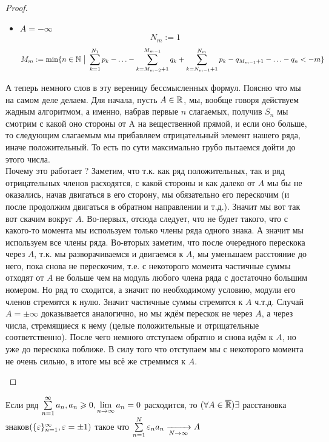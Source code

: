 \begin{proof}
\begin{itemize}
		
		\item $A = -\infty$
		\[
		N_m := 1
		\]
		\[
		M_m := \min \{n \in \mathbb{N} \ \big|\  \sum\limits_{k = 1}^{N_1} p_k - \ldots - \sum\limits_{k = M_{m - 2} + 1}^{M_{m - 1}} q_k + \sum\limits_{k = N_{m - 1} + 1}^{N_m} p_k - q_{M_{m - 1} + 1} - \ldots - q_n < -m\}
		\]
		
	\end{itemize}

\begin{anote}

	А теперь немного слов в эту вереницу бессмысленных формул. Поясню что мы на самом деле делаем. Для начала, пусть $A\in\mathbb{R}$, мы, вообще говоря действуем жадным алгоритмом, а именно, набрав первые $n$ слагаемых, получив $S_n$ мы смотрим с какой оно стороны от A на вещественной прямой, и если оно больше, то следующим слагаемым мы прибавляем отрицательный элемент нашего ряда, иначе положительный. То есть по сути максимально грубо пытаемся дойти до этого числа.\\
		Почему это работает ? Заметим, что т.к. как ряд положительных, так и ряд отрицательных членов расходятся, с какой стороны и как далеко от $A$ мы бы не оказались, начав двигаться в его сторону, мы обязательно его перескочим (и после продолжим двигаться в обратном направлении и т.д.). Значит мы вот так вот скачим вокруг $A$. Во-первых, отсюда следует, что не будет такого, что с какого-то момента мы используем только члены ряда одного знака. А значит мы используем все члены ряда. Во-вторых заметим, что после очередного перескока через $A$, т.к. мы разворачиваемся и двигаемся к $A$, мы уменьшаем расстояние до него, пока снова не перескочим, т.е. с некоторого момента частичные суммы отходят от $A$ не больше чем на модуль любого члена ряда с достаточно большим номером. Но ряд то сходится, а значит по необходимому условию, модули его членов стремятся к нулю. Значит частичные суммы стремятся к $A$ ч.т.д. Случай $A = \pm \infty$ доказывается аналогично, но мы ждём перескок не через $A$, а через числа, стремящиеся к нему (целые положительные и отрицательные соответственно). После чего немного отступаем обратно и снова идём к $A$, но уже до перескока поближе. В силу того что отступаем мы с некоторого момента не очень сильно, в итоге мы всё же стремимся к $A$.
\end{anote}
\end{proof}

\begin{note}
	Если ряд $\sum\limits_{n=1}^\infty a_n, a_n \geqslant0, \lim\limits_{n\to\infty}a_n = 0$ расходится, то $(\forall A\in\overline{\mathbb{R}}) \exists$ расстановка знаков$(\{\varepsilon\}_{n=1}^\infty, \varepsilon = \pm1) $ такое что $\sum\limits_{n=1}^N \varepsilon_na_n\xrightarrow[N \to \infty]{}A$
\end{note}


